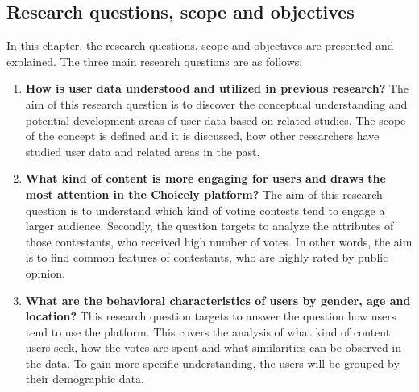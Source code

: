 \subsection{Research questions, scope and objectives}
\label{section::reseach_questions}
In this chapter, the research questions, scope and objectives are presented and explained. The three main research questions are as follows:

    \begin{enumerate}[label=RQ\arabic*:]
        \item \textbf{How is user data understood and utilized in previous research?} The aim of this research question is to discover the conceptual understanding and potential development areas of user data based on related studies. The scope of the concept is defined and it is discussed, how other researchers have studied user data and related areas in the past.
        
        \item \textbf{What kind of content is more engaging for users and draws the most attention in the Choicely platform?} The aim of this research question is to understand which kind of voting contests tend to engage a larger audience. Secondly, the question targets to analyze the attributes of those contestants, who received high number of votes. In other words, the aim is to find common features of contestants, who are highly rated by public opinion.

        \item \textbf{What are the behavioral characteristics of users by gender, age and location?} This research question targets to answer the question how users tend to use the platform. This covers the analysis of what kind of content users seek, how the votes are spent and what similarities can be observed in the data. To gain more specific understanding, the users will be grouped by their demographic data.



    \end{enumerate}

